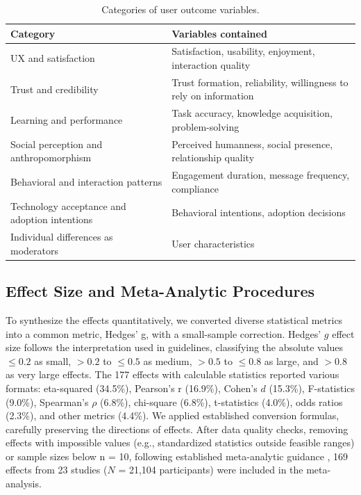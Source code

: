 \documentclass[preprint,review,12pt,authoryear,nonatbib]{elsarticle}
\begin{document}
\begin{table}[h]
\caption{Categories of user outcome variables.}
\label{tab:categories}
\footnotesize
\begin{tabular}{@{}p{}p{}@{}}
\toprule
\textbf{Category} & \textbf{Variables contained} \\
\midrule
UX and satisfaction & Satisfaction, usability, enjoyment, interaction quality \\
\addlinespace
Trust and credibility & Trust formation, reliability, willingness to rely on information \\
\addlinespace
Learning and performance & Task accuracy, knowledge acquisition, problem-solving \\
\addlinespace
Social perception and anthropomorphism & Perceived humanness, social presence, relationship quality \\
\addlinespace
Behavioral and interaction patterns & Engagement duration, message frequency, compliance \\
\addlinespace
Technology acceptance and adoption intentions & Behavioral intentions, adoption decisions \\
\addlinespace
Individual differences as moderators & User characteristics \\
\bottomrule
\end{tabular}
\end{table}



\subsection{Effect Size and Meta-Analytic Procedures}

To synthesize the effects quantitatively, we converted diverse statistical metrics into a common metric, Hedges' g, with a small-sample correction. Hedges' $g$ effect size follows the interpretation used in \textcite{cohen2013statistical} guidelines, classifying the absolute values $\leq0.2$ as small, $>0.2$ to $\leq0.5$ as medium, $>0.5$ to $\leq0.8$ as large, and $>0.8$ as very large effects. The 177 effects with calculable statistics reported various formats: eta-squared (34.5\%), Pearson's r (16.9\%), Cohen's $d$ (15.3\%), F-statistics (9.0\%), Spearman's $\rho$ (6.8\%), chi-square (6.8\%), t-statistics (4.0\%), odds ratios (2.3\%), and other metrics (4.4\%). We applied established conversion formulas, carefully preserving the directions of effects. After data quality checks, removing effects with impossible values (e.g., standardized statistics outside feasible ranges) or sample sizes below n = 10, following established meta-analytic guidance \parencite{borenstein2010basic}, 169 effects from 23 studies ($N$ = 21,104 participants) were included in the meta-analysis.
\end{document}
